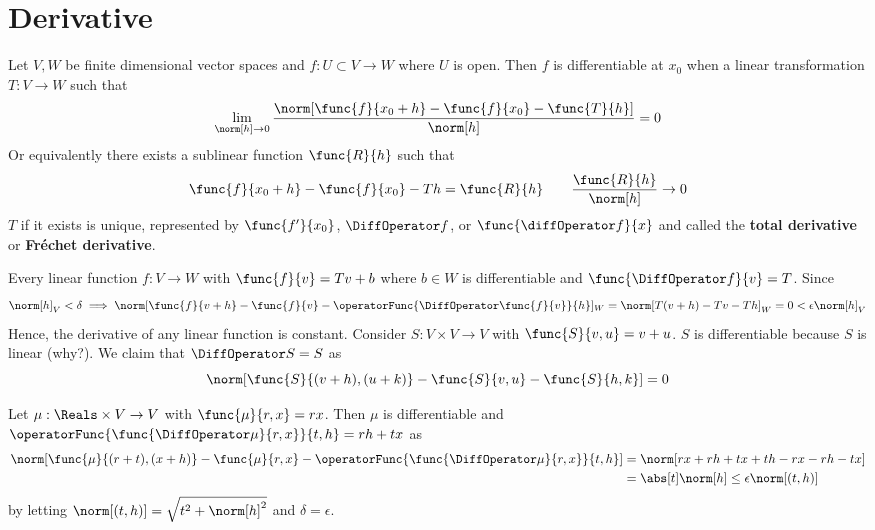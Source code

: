 \section{Derivative}
Let \(V,W\) be finite dimensional vector spaces and \(f: U \subset V \to W\) where \(U\) is open. Then \(f\) is differentiable at \(x_0\) when a linear transformation \(T : V \to W\) such that
\begin{equation*}
    \lim_{\norm[h] \to 0} \dfrac{\norm[\func{f}{x_0 + h} - \func{f}{x_0} - \func{T}{h}]}{\norm[h]}= 0
\end{equation*}
Or equivalently there exists a sublinear function \(\func{R}{h}\) such that
\begin{equation*}
    \func{f}{x_0 + h} - \func{f}{x_0} - Th = \func{R}{h} \qquad \frac{\func{R}{h}}{\norm[h]} \to 0
\end{equation*}
\(T\) if it exists is unique, represented by \(\func{f'}{x_0}\), \(\DiffOperator f\), or \(\func{\diffOperator f}{x}\) and called the \textbf{total derivative} or \textbf{Fr\'{e}chet derivative}.

\begin{example}
    Every linear function \(f : V \to W\) with \(\func{f}{v} = Tv + b\) where \(b \in W\) is differentiable and \(\func{\DiffOperator f}{v} = T\). Since
    \begin{equation*}
        \norm[h]_V < \delta \implies \norm[\func{f}{v + h} - \func{f}{v} - \operatorFunc{\DiffOperator \func{f}{v}}{h}]_W = \norm[T(v+h) - Tv - Th]_W = 0 < \epsilon \norm[h]_V
    \end{equation*}
    Hence, the derivative of any linear function is constant.
    Consider \(S : V \times V \to V\) with \(\func{S}{v,u} = v + u\). \(S\) is differentiable because \(S\) is linear (why?). We claim that \(\DiffOperator S = S\) as
    \begin{equation*}
        \norm[\func{S}{(v + h),(u + k)} - \func{S}{v,u} - \func{S}{h,k}] = 0
    \end{equation*}
\end{example}

\begin{example}
    Let \(\mu : \Reals \times V \to V\) with \(\func{\mu}{r,x} = rx\). Then \(\mu\) is differentiable and \(\operatorFunc{\func{\DiffOperator \mu}{r,x}}{t,h} = rh + tx\) as
    \begin{align*}
        \norm[\func{\mu}{(r + t),(x + h)} - \func{\mu}{r,x} - \operatorFunc{\func{\DiffOperator \mu}{r,x}}{t,h}] & = \norm[rx + rh + tx + th - rx - rh - tx]     \\
                                                                                                                 & = \abs[t] \norm[h] \leq \epsilon \norm[(t,h)]
    \end{align*}
    by letting \(\norm[(t,h)] = \sqrt{t^2 + \norm[h]^2}\) and \(\delta = \epsilon\).
\end{example}

